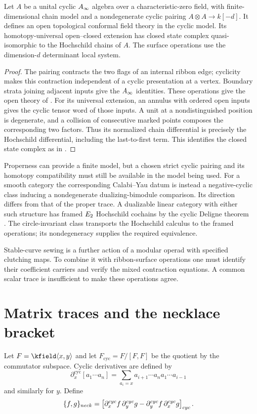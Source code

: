 \begin{theorem}
Let $A$ be a unital cyclic $A_\infty$ algebra over a characteristic-zero field,
with finite-dimensional chain model and a nondegenerate cyclic pairing
$A\otimes A\to k[-d]$.
It defines an open topological conformal field theory in the cyclic model.
Its homotopy-universal open--closed extension has closed state complex
quasi-isomorphic to the Hochschild chains of $A$.
The surface operations use the dimension-$d$ determinant local system.
\end{theorem}
\begin{proof}
The pairing contracts the two flags of an internal ribbon edge; cyclicity
makes this contraction independent of a cyclic presentation at a vertex.
Boundary strata joining adjacent inputs give the $A_\infty$ identities.
These operations give the open theory of \cite[Theorem~A]{CostelloCY}.
For its universal extension, an annulus with ordered open inputs gives the
cyclic tensor word of those inputs. A unit at a nondistinguished position is
degenerate, and a collision of consecutive marked points composes the
corresponding two factors. Thus its normalized chain differential is precisely
the Hochschild differential, including the last-to-first term.
This identifies the closed state complex as in
\cite[Proposition~7.4.3]{CostelloCY}.
\end{proof}

Properness can provide a finite model, but a chosen strict cyclic pairing and
its homotopy compatibility must still be available in the model being used.
For a smooth category the corresponding Calabi--Yau datum is instead a
negative-cyclic class inducing a nondegenerate dualizing-bimodule comparison.
Its direction differs from that of the proper trace.
A dualizable linear category with either such structure has framed $E_2$
Hochschild cochains by the cyclic Deligne theorem
\cite[Theorem~1.0.1 and Section~4]{BravRozenblyum}.
The circle-invariant class transports the Hochschild calculus to the framed
operations; its nondegeneracy supplies the required equivalence.

Stable-curve sewing is a further action of a modular operad with specified
clutching maps. To combine it with ribbon-surface operations one must identify
their coefficient carriers and verify the mixed contraction equations.
A common scalar trace is insufficient to make these operations agree.

\section{Matrix traces and the necklace bracket}
Let $F=\kfield\angles{x,y}$ and let $F_{\mathrm{cyc}}=F/[F,F]$ be the quotient by the commutator subspace. Cyclic derivatives are defined by
\[
 \partial_x^{\mathrm{cyc}}[a_1\cdots a_n]
 =\sum_{a_i=x}a_{i+1}\cdots a_na_1\cdots a_{i-1}
\]
and similarly for $y$. Define
\[
 \{f,g\}_{neck}
 =\left[
 \partial_x^{cyc}f\,\partial_y^{cyc}g
 -\partial_y^{cyc}f\,\partial_x^{cyc}g\right]_{cyc}.
\]

